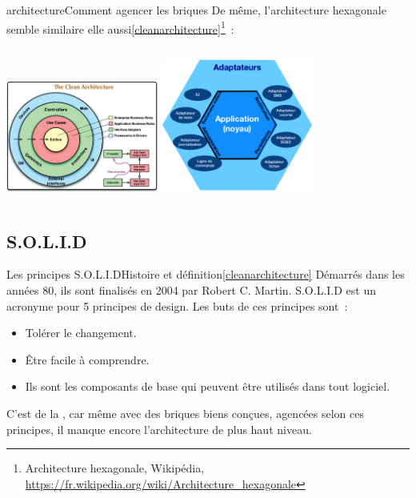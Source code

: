 \documentclass{beamer}
\begin{document}
    \begin{frame}{ architecture}{Comment agencer les briques}
        De même, l'architecture hexagonale semble similaire elle aussi\cref{cleanarchitecture}\footnotestep\footnote{Architecture hexagonale, Wikipédia, \url{https://fr.wikipedia.org/wiki/Architecture_hexagonale}}~:
        \bigbreak
        \begin{columns}
            \centering
            \includegraphics[width=5cm]{image/the-clean-architecture}
            \centering
            \includegraphics[width=5cm]{image/hexagonal-architecture}
        \end{columns}
    \end{frame}

    \subsection{S.O.L.I.D}\label{subsec:mid-level-solid}


    \begin{frame}{Les principes S.O.L.I.D}{Histoire et définition\cref{cleanarchitecture}}
        Démarrés dans les années 80, ils sont finalisés en 2004 par Robert C. Martin.
        S.O.L.I.D est un acronyme pour 5 principes de design.
        \bigbreak
        Les buts de ces principes sont~:
        \begin{itemize}
            \item Tolérer le changement.
            \item Être facile à comprendre.
            \item Ils sont les composants de base qui peuvent être utilisés dans tout logiciel.
        \end{itemize}
        \bigbreak
        C'est de la , car même avec des briques biens conçues, agencées selon ces principes, il manque encore l'architecture de plus haut niveau.
    \end{frame}
\end{document}
